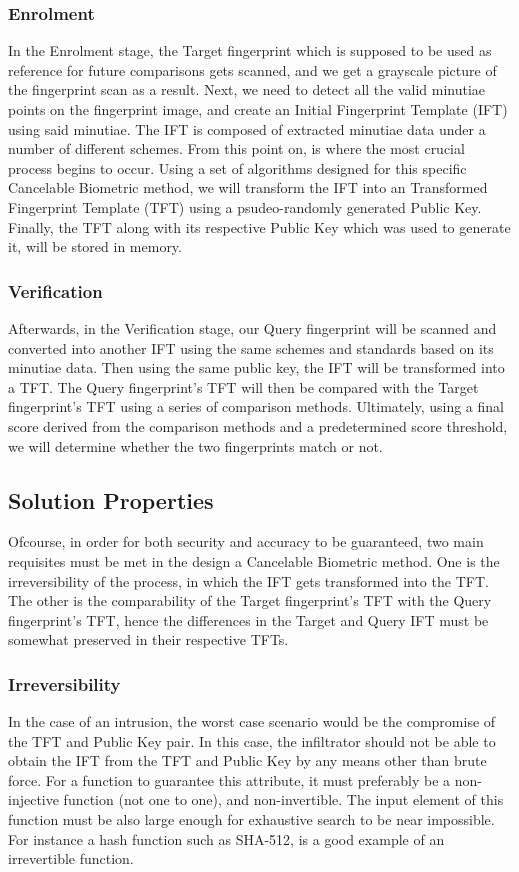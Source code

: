 \documentclass[fyp]{socreport}
\begin{document}
\subsubsection{Enrolment}
In the Enrolment stage, the Target fingerprint which is supposed to be used as reference for future comparisons gets scanned, and we get a grayscale picture of the fingerprint scan as a result. Next, we need to detect all the valid minutiae points on the fingerprint image, and create an Initial Fingerprint Template (IFT) using said minutiae. The IFT is composed of extracted minutiae data under a number of different schemes. From this point on, is where the most crucial process begins to occur. Using a set of algorithms designed for this specific Cancelable Biometric method, we will transform the IFT into an Transformed Fingerprint Template (TFT) using a psudeo-randomly generated Public Key. Finally, the TFT along with its respective Public Key which was used to generate it, will be stored in memory.

\subsubsection{Verification}
Afterwards, in the Verification stage, our Query fingerprint will be scanned and converted into another IFT using the same schemes and standards based on its minutiae data. Then using the same public key, the IFT will be transformed into a TFT. The Query fingerprint's TFT will then be compared with the Target fingerprint's TFT using a series of comparison methods. Ultimately, using a final score derived from the comparison methods and a predetermined score threshold, we will determine whether the two fingerprints match or not.

\subsection{Solution Properties}
Ofcourse, in order for both security and accuracy to be guaranteed, two main requisites must be met in the design a Cancelable Biometric method. One is the irreversibility of the process, in which the IFT gets transformed into the TFT. The other is the comparability of the Target fingerprint's TFT with the Query fingerprint's TFT, hence the differences in the Target and Query IFT must be somewhat preserved in their respective TFTs.

\subsubsection{Irreversibility}
In the case of an intrusion, the worst case scenario would be the compromise of the TFT and Public Key pair. In this case, the infiltrator should not be able to obtain the IFT from the TFT and Public Key by any means other than brute force. For a function to guarantee this attribute, it must preferably be a non-injective function (not one to one), and non-invertible. The input element of this function must be also large enough for exhaustive search to be near impossible. For instance a hash function such as SHA-512, is a good example of an irrevertible function. 
\end{document}
